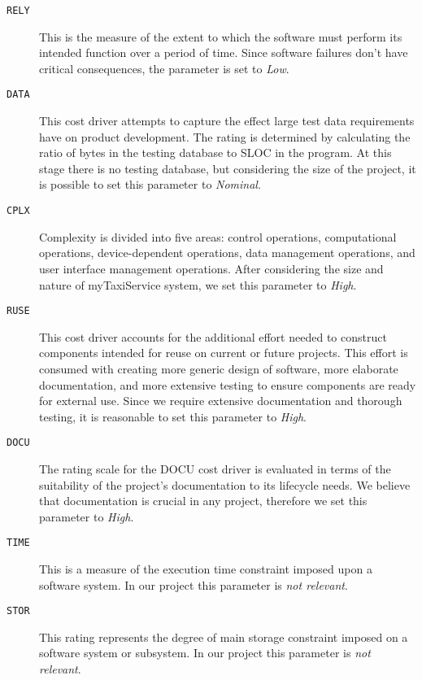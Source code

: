 \begin{description}


	\item [\normalfont\texttt{RELY}] This is the measure of the extent to which the software must perform its intended function over a period of time. Since software failures don't have critical consequences, the parameter is set to \emph{Low}.

	\item [\normalfont\texttt{DATA}] This cost driver attempts to capture the effect large test data requirements have on product development. The rating is determined by calculating the ratio of bytes in the testing database to SLOC in the program. At this stage there is no testing database, but considering the size of the project, it is possible to set this parameter to \emph{Nominal}.

	\item [\normalfont\texttt{CPLX}] Complexity is divided into five areas: control operations, computational operations, device-dependent operations, data management operations, and user interface management operations. After considering the size and nature of myTaxiService system, we set this parameter to \emph{High}.

	\item [\normalfont\texttt{RUSE}] This cost driver accounts for the additional effort needed to construct components intended for reuse on current or future projects. This effort is consumed with creating more generic design of software, more elaborate documentation, and more extensive testing to ensure components are ready for external use. Since we require extensive documentation and thorough testing, it is reasonable to set this parameter to \emph{High}.

	\item [\normalfont\texttt{DOCU}] The rating scale for the DOCU cost driver is evaluated in terms of the suitability of the project's documentation to its lifecycle needs. We believe that documentation is crucial in any project, therefore we set this parameter to \emph{High}.

	\item [\normalfont\texttt{TIME}] This is a measure of the execution time constraint imposed upon a software system. In our project this parameter is \emph{not relevant}.

	\item [\normalfont\texttt{STOR}] This rating represents the degree of main storage constraint imposed on a software system or subsystem. In our project this parameter is \emph{not relevant}.


\end{description}
